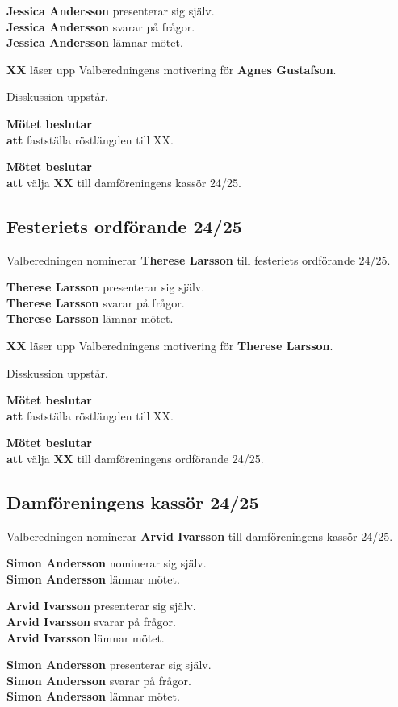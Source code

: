 \documentclass{datateknologsektionen-document}
\newcommand{\ind}{\hspace*{2em}}
\newcommand{\motetbeslutar}{\textbf{Mötet beslutar}}
\newcommand{\att}{\\\ind\textbf{att}}
\begin{document}
\textbf{Jessica Andersson} presenterar sig själv.\\
\textbf{Jessica Andersson} svarar på frågor.\\
\textbf{Jessica Andersson} lämnar mötet.

\textbf{XX} läser upp Valberedningens motivering för \textbf{Agnes Gustafson}.

Disskussion uppstår.

\motetbeslutar
\att{} fastställa röstlängden till XX.

\motetbeslutar
\att{} välja \textbf{XX} till damföreningens kassör 24/25.

\subsection{Festeriets ordförande 24/25}

Valberedningen nominerar \textbf{Therese Larsson} till festeriets ordförande 24/25.

\textbf{Therese Larsson} presenterar sig själv.\\
\textbf{Therese Larsson} svarar på frågor.\\
\textbf{Therese Larsson} lämnar mötet.

\textbf{XX} läser upp Valberedningens motivering för \textbf{Therese Larsson}.

Disskussion uppstår.

\motetbeslutar
\att{} fastställa röstlängden till XX.

\motetbeslutar
\att{} välja \textbf{XX} till damföreningens ordförande 24/25.

\subsection{Damföreningens kassör 24/25}

Valberedningen nominerar \textbf{Arvid Ivarsson} till damföreningens kassör 24/25.

\textbf{Simon Andersson} nominerar sig själv. \\
\textbf{Simon Andersson} lämnar mötet.

\textbf{Arvid Ivarsson} presenterar sig själv.\\
\textbf{Arvid Ivarsson} svarar på frågor.\\
\textbf{Arvid Ivarsson} lämnar mötet.

\textbf{Simon Andersson} presenterar sig själv.\\
\textbf{Simon Andersson} svarar på frågor.\\
\textbf{Simon Andersson} lämnar mötet.
\end{document}
